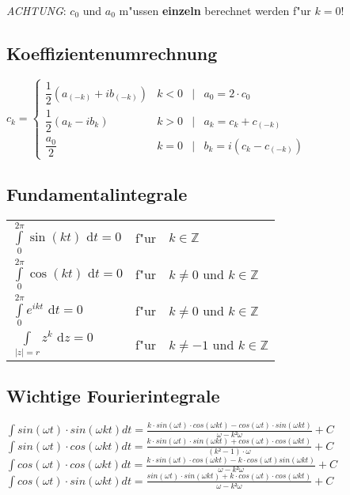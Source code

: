 \emph{ACHTUNG}: \(c_0\) und \(a_0\) m"ussen \textbf{einzeln} berechnet werden f"ur \(k=0\)!


\subsection{Koeffizientenumrechnung}
\( c_k = \left\{\begin{array}{llcl}
\dfrac{1}{2}(a_{(-k)} + ib_{(-k)}) & k<0 & \Big\vert & a_0 = 2\cdot c_0\\
\dfrac{1}{2}(a_k - ib_k) & k>0 & \Bigg\vert & a_k = c_k + c_{(-k)}\\
\dfrac{a_0}{2} & k = 0 & \Big\vert & b_k = i(c_k - c_{(-k)})
\end{array}\right. \)

\subsection{Fundamentalintegrale}
\begin{tabular}{lll}
\(\int\limits_0^{2\pi} \sin(kt) \text{ d}t = 0 \)		&	f"ur	&	\( k \in \mathbb{Z}\)\\
\(\int\limits_0^{2\pi} \cos(kt) \text{ d}t = 0 \)		&	f"ur	&	\( k \neq 0 \) und \( k \in \mathbb{Z}\)\\
\(\int\limits_0^{2\pi} e^{ikt} \text{ d}t = 0 \)		&	f"ur	&	\( k \neq 0 \) und \( k \in \mathbb{Z}\)\\
\(\int\limits_{|z| = r} z^k \text{ d}z = 0 \)		&	f"ur	&	\( k \neq -1 \) und \( k \in \mathbb{Z}\)
\end{tabular}

\subsection{Wichtige Fourierintegrale}
$\int sin(\omega t) \cdot sin(\omega kt) dt = \frac{k \cdot sin(\omega t)\cdot cos(\omega kt) - cos(\omega t) \cdot sin(\omega kt)}{\omega - k² \omega} + C$ \\

$\int sin(\omega t) \cdot cos(\omega kt) dt = \frac{k \cdot sin(\omega t)\cdot sin(\omega kt) + cos(\omega t) \cdot cos(\omega kt)}{(k² - 1) \cdot  \omega} + C$ \\

$\int cos(\omega t) \cdot cos(\omega kt) dt = \frac{k \cdot sin(\omega t)\cdot cos(\omega kt) - k \cdot cos(\omega t)sin(\omega kt)}{\omega - k² \omega} + C$ \\

$\int cos(\omega t) \cdot sin(\omega kt) dt = \frac{sin(\omega t)\cdot sin(\omega kt) + k \cdot cos(\omega t)\cdot cos(\omega kt)}{\omega - k² \omega} + C$ \\



